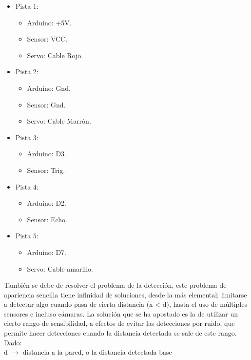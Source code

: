 \documentclass[12pt,twocolumn]{article}
\begin{document}
	\begin{itemize}
	\setlength\itemsep{-0.5em}
	\item Pista 1:
		\begin{itemize}
		\setlength\itemsep{-0.3em}
		\item Arduino: +5V.
		\item Sensor: VCC.
		\item Servo: Cable Rojo.
		\end{itemize}
	\item Pista 2:
		\begin{itemize}
		\setlength\itemsep{-0.3em}
		\item Arduino: Gnd.
		\item Sensor: Gnd.
		\item Servo: Cable Marrón.
		\end{itemize}		
	\item Pista 3:
		\begin{itemize}
		\setlength\itemsep{-0.3em}
		\item Arduino: D3.
		\item Sensor: Trig.
		\end{itemize}	
	\item Pista 4:
		\begin{itemize}
		\setlength\itemsep{-0.3em}
		\item Arduino: D2.
		\item Sensor: Echo.
		\end{itemize}	
	\item Pista 5:
		\begin{itemize}
		\setlength\itemsep{-0.3em}
		\item Arduino: D7.
		\item Servo: Cable amarillo.
		\end{itemize}	
	\end{itemize}
	

También se debe de resolver el problema de la detección, este problema de apariencia sencilla tiene infinidad de soluciones, desde la más elemental; limitarse a detectar algo cuando pasa de cierta distancia (x < d), hasta el uso de múltiples sensores e incluso cámaras. La solución que se ha apostado es la de utilizar un cierto rango de sensibilidad, a efectos de evitar las detecciones por ruido, que permite hacer detecciones cuando la distancia detectada se sale de este rango. Dado:\\

d $\rightarrow$ distancia a la pared, o la distancia detectada base
\end{document}
